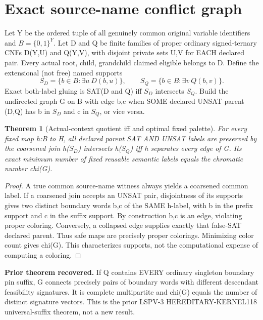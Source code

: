 \documentclass[11pt]{article}
\newtheorem{theorem}{Theorem}
\begin{document}
\section{Exact source-name conflict graph}
Let Y be the ordered tuple of all genuinely common original variable identifiers and \(B=\{0,1\}^Y\). Let D and Q be finite families of proper ordinary signed-ternary CNFs D(Y,U) and Q(Y,V), with disjoint private sets U,V for EACH declared pair. Every actual root, child, grandchild claimed eligible belongs to D. Define the extensional (not free) named supports
\[
S_D=\{b\in B:\exists u\ D(b,u)\},\qquad S_Q=\{b\in B:\exists v\ Q(b,v)\}.
\]
Exact both-label gluing is SAT(D and Q) iff \(S_D\) intersects \(S_Q\).
Build the undirected graph G on B with edge {b,c} when SOME declared UNSAT parent (D,Q) has b in \(S_D\) and c in \(S_Q\), or vice versa.
\begin{theorem}[Actual-context quotient iff and optimal fixed palette]
For every fixed map h:B to H, all declared parent SAT AND UNSAT labels are preserved by the coarsened join h(\(S_D\)) intersects h(\(S_Q\)) iff h separates every edge of G. Its exact minimum number of fixed reusable semantic labels equals the chromatic number chi(G).
\end{theorem}
\begin{proof}
A true common source-name witness always yields a coarsened common label. If a coarsened join accepts an UNSAT pair, disjointness of its supports gives two distinct boundary words b,c of the SAME h-label, with b in the prefix support and c in the suffix support. By construction {b,c} is an edge, violating proper coloring. Conversely, a collapsed edge supplies exactly that false-SAT declared parent. Thus safe maps are precisely proper colorings. Minimizing color count gives chi(G). This characterizes supports, not the computational expense of computing a coloring.
\end{proof}
\noindent\textbf{Prior theorem recovered.} If Q contains EVERY ordinary singleton boundary pin suffix, G connects precisely pairs of boundary words with different descendant feasibility signatures. It is complete multipartite and chi(G) equals the number of distinct signature vectors. This is the prior LSPV-3 HEREDITARY-KERNEL118 universal-suffix theorem, not a new result.
\end{document}
